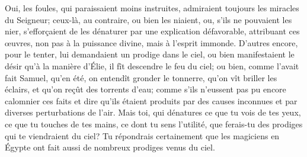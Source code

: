 Oui, les foules, qui paraissaient moins instruites,
	admiraient toujours les miracles du Seigneur;
	ceux-là, au contraire, ou bien les niaient,
	ou, s’ils ne pouvaient les nier,
		s’efforçaient de les dénaturer par une explication défavorable,
	attribuant ces œuvres, non pas à la puissance divine,
		mais à l’esprit immonde.
D’autres encore, pour le tenter, lui demandaient un prodige dans le ciel,
	ou bien manifestaient le désir qu’à la manière d’Élie,
	il fît descendre le feu du ciel;
	ou bien, comme l’avait fait Samuel,
	qu’en été, on entendît gronder le tonnerre, qu’on vît briller les éclairs,
	et qu’on reçût des torrents d’eau;
	comme s’ils n’eussent pas pu encore calomnier ces faits
	et dire qu’ils étaient produits par des causes inconnues
		et par diverses perturbations de l’air.
Mais toi, qui dénatures ce que tu vois de tes yeux,
	ce que tu touches de tes mains, ce dont tu sens l’utilité,
	que ferais-tu des prodiges qui te viendraient du ciel?
Tu répondrais certainement que les magiciens en Égypte
	ont fait aussi de nombreux prodiges venus du ciel.
